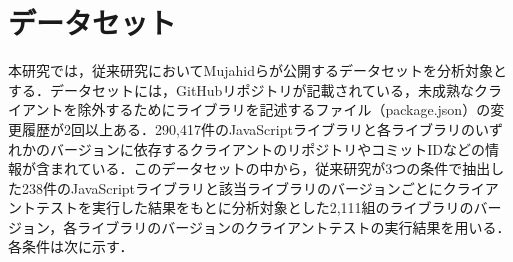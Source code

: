 \documentclass[11pt]{jreport}
\begin{document}
\section{データセット}
\begin{table}[b]
    \caption{分析対象としたライブラリ}
    \label{table:dataset}
    \centering
\end{table}
本研究では，従来研究においてMujahidらが公開するデータセットを分析対象とする．データセットには，GitHubリポジトリが記載されている，未成熟なクライアントを除外するためにライブラリを記述するファイル（package.json）の変更履歴が2回以上ある．290,417件のJavaScriptライブラリと各ライブラリのいずれかのバージョンに依存するクライアントのリポジトリやコミットIDなどの情報が含まれている．このデータセットの中から，従来研究\cite{matsuda}が3つの条件で抽出した238件のJavaScriptライブラリと該当ライブラリのバージョンごとにクライアントテストを実行した結果をもとに分析対象とした2,111組のライブラリのバージョン，各ライブラリのバージョンのクライアントテストの実行結果を用いる．各条件は次に示す．
\end{document}
